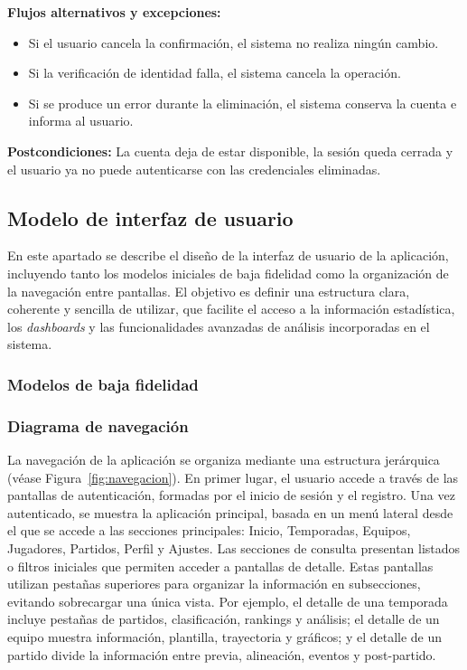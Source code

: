\noindent \textbf{Flujos alternativos y excepciones:}
\begin{itemize}
    \item Si el usuario cancela la confirmación, el sistema no realiza ningún cambio.
    \item Si la verificación de identidad falla, el sistema cancela la operación.
    \item Si se produce un error durante la eliminación, el sistema conserva la cuenta e informa al usuario.
\end{itemize}

\noindent \textbf{Postcondiciones:} La cuenta deja de estar disponible, la sesión queda cerrada y el usuario ya no puede autenticarse con las credenciales eliminadas.

\subsection{Modelo de interfaz de usuario}
En este apartado se describe el diseño de la interfaz de usuario de la aplicación, incluyendo tanto los modelos iniciales de baja fidelidad como la organización de la navegación entre pantallas. El objetivo es definir una estructura clara, coherente y sencilla de utilizar, que facilite el acceso a la información estadística, los \textit{dashboards} y las funcionalidades avanzadas de análisis incorporadas en el sistema.

\subsubsection{Modelos de baja fidelidad}
\subsubsection{Diagrama de navegación}
La navegación de la aplicación se organiza mediante una estructura jerárquica (véase Figura~\ref{fig:navegacion}). En primer lugar, el usuario accede a través de las pantallas de autenticación, formadas por el inicio de sesión y el registro. Una vez autenticado, se muestra la aplicación principal, basada en un menú lateral desde el que se accede a las secciones principales: Inicio, Temporadas, Equipos, Jugadores, Partidos, Perfil y Ajustes.
Las secciones de consulta presentan listados o filtros iniciales que permiten acceder a pantallas de detalle. Estas pantallas utilizan pestañas superiores para organizar la información en subsecciones, evitando sobrecargar una única vista. Por ejemplo, el detalle de una temporada incluye pestañas de partidos, clasificación, rankings y análisis; el detalle de un equipo muestra información, plantilla, trayectoria y gráficos; y el detalle de un partido divide la información entre previa, alineación, eventos y post-partido.


